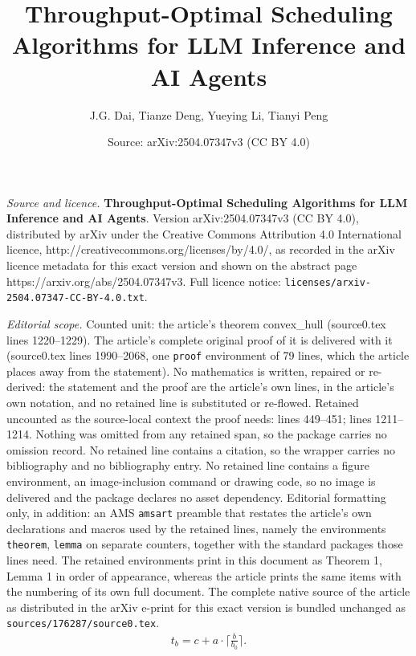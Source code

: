 \documentclass[10pt,a4paper]{amsart}
\title{\textbf{Throughput-Optimal Scheduling Algorithms for LLM Inference and AI Agents}}
\author{J.G. Dai, Tianze Deng, Yueying Li, Tianyi Peng}
\date{Source: arXiv:2504.07347v3 (CC BY 4.0)}
\begin{document}
\maketitle

\noindent\emph{Source and licence.} \textbf{Throughput-Optimal Scheduling Algorithms for LLM Inference and AI Agents}. Version arXiv:2504.07347v3 (CC BY 4.0), distributed by arXiv under the Creative Commons Attribution 4.0 International licence, http://creativecommons.org/licenses/by/4.0/, as recorded in the arXiv licence metadata for this exact version and shown on the abstract page https://arxiv.org/abs/2504.07347v3. Full licence notice: \texttt{licenses/arxiv-2504.07347-CC-BY-4.0.txt}.\par\smallskip

\noindent\textit{Editorial scope.} Counted unit: the article's theorem convex\_hull (source0.tex lines 1220--1229). The article's complete original proof of it is delivered with it (source0.tex lines 1990--2068, one \texttt{proof} environment of 79 lines, which the article places away from the statement). No mathematics is written, repaired or re-derived: the statement and the proof are the article's own lines, in the article's own notation, and no retained line is substituted or re-flowed.  Retained uncounted as the source-local context the proof needs: lines 449--451; lines 1211--1214.  Nothing was omitted from any retained span, so the package carries no omission record.  No retained line contains a citation, so the wrapper carries no bibliography and no bibliography entry.  No retained line contains a figure environment, an image-inclusion command or drawing code, so no image is delivered and the package declares no asset dependency.  Editorial formatting only, in addition: an AMS \texttt{amsart} preamble that restates the article's own declarations and macros used by the retained lines, namely the environments \texttt{theorem}, \texttt{lemma} on separate counters, together with the standard packages those lines need.  The retained environments print in this document as Theorem 1, Lemma 1 in order of appearance, whereas the article prints the same items with the numbering of its own full document.  The complete native source of the article as distributed in the arXiv e-print for this exact version is bundled unchanged as \texttt{sources/176287/source0.tex}.
\begin{align}
    t_{b} = c + a \cdot \lceil \frac{b}{b_0} \rceil. \label{eq:batch-processing-time}  
\end{align}
\end{document}
